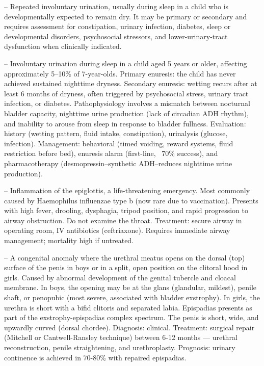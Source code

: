 -- Repeated involuntary urination, usually during sleep in a child who is developmentally expected to remain dry. It may be primary or secondary and requires assessment for constipation, urinary infection, diabetes, sleep or developmental disorders, psychosocial stressors, and lower-urinary-tract dysfunction when clinically indicated.

-- Involuntary urination during sleep in a child aged 5 years or older, affecting approximately 5--10\% of 7-year-olds. Primary enuresis: the child has never achieved sustained nighttime dryness. Secondary enuresis: wetting recurs after at least 6 months of dryness, often triggered by psychosocial stress, urinary tract infection, or diabetes. Pathophysiology involves a mismatch between nocturnal bladder capacity, nighttime urine production (lack of circadian ADH rhythm), and inability to arouse from sleep in response to bladder fullness. Evaluation: history (wetting pattern, fluid intake, constipation), urinalysis (glucose, infection). Management: behavioral (timed voiding, reward systems, fluid restriction before bed), enuresis alarm (first-line, ~70\% success), and pharmacotherapy (desmopressin--synthetic ADH--reduces nighttime urine production).

-- Inflammation of the epiglottis, a life-threatening emergency. Most commonly caused by Haemophilus influenzae type b (now rare due to vaccination). Presents with high fever, drooling, dysphagia, tripod position, and rapid progression to airway obstruction. Do not examine the throat. Treatment: secure airway in operating room, IV antibiotics (ceftriaxone). Requires immediate airway management; mortality high if untreated.

-- A congenital anomaly where the urethral meatus opens on the dorsal (top) surface of the penis in boys or in a split, open position on the clitoral hood in girls. Caused by abnormal development of the genital tubercle and cloacal membrane. In boys, the opening may be at the glans (glandular, mildest), penile shaft, or penopubic (most severe, associated with bladder exstrophy). In girls, the urethra is short with a bifid clitoris and separated labia. Epispadias presents as part of the exstrophy-epispadias complex spectrum. The penis is short, wide, and upwardly curved (dorsal chordee). Diagnosis: clinical. Treatment: surgical repair (Mitchell or Cantwell-Ransley technique) between 6-12 months — urethral reconstruction, penile straightening, and urethroplasty. Prognosis: urinary continence is achieved in 70-80\% with repaired epispadias.

